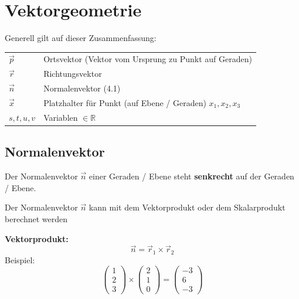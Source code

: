 \section{Vektorgeometrie}

Generell gilt auf dieser Zusammenfassung:
\vspace{0.2cm}
		
\begin{tabular}{ll}
	$\vec{p}$ 		& Ortsvektor (Vektor vom Ursprung zu Punkt auf Geraden)			\\
	$\vec{r}$ 		& Richtungsvektor 												\\
    $\vec{n}$ 		& Normalenvektor (4.1)											\\
	$\vec{x}$ 		& Platzhalter für Punkt (auf Ebene / Geraden) $x_1, x_2, x_3$ 	\\
	$s, t, u, v$ 	& Variablen $\in \mathbb{R}$ 
\end{tabular}		


\subsection{Normalenvektor}		    

Der Normalenvektor $\vec{n}$ einer Geraden / Ebene steht \textbf{senkrecht} auf der Geraden / Ebene.

Der Normalenvektor $\vec{n}$ kann mit dem Vektorprodukt oder dem Skalarprodukt berechnet werden
\vspace{0.2cm}

\noindent\textbf{Vektorprodukt:}
\[
\vec{n} = \vec{r}_1 \times \vec{r}_2
\]
Beispiel:
\[
\begin{pmatrix}1\\2\\3\end{pmatrix}
\times
\begin{pmatrix}2\\1\\0\end{pmatrix}
=
\begin{pmatrix}-3\\6\\-3\end{pmatrix}
\]

